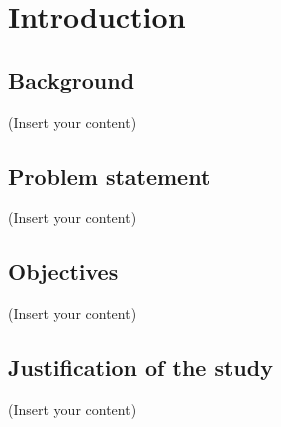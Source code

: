 \section{Introduction}
\subsection{Background}
(Insert your content)
\subsection{Problem statement}
(Insert your content)
\subsection{Objectives}
(Insert your content)
\subsection{Justification of the study}
(Insert your content)